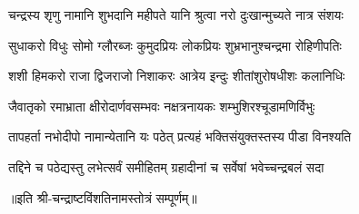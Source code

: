 

\twolineshloka
{चन्द्रस्य शृणु नामानि शुभदानि महीपते}
{यानि श्रुत्वा नरो दुःखान्मुच्यते नात्र संशयः}

\twolineshloka
{सुधाकरो विधुः सोमो ग्लौरब्जः कुमुदप्रियः}
{लोकप्रियः शुभ्रभानुश्चन्द्रमा रोहिणीपतिः}

\twolineshloka
{शशी हिमकरो राजा द्विजराजो निशाकरः}
{आत्रेय इन्दुः शीतांशुरोषधीशः कलानिधिः}

\twolineshloka
{जैवातृको रमाभ्राता क्षीरोदार्णवसम्भवः}
{नक्षत्रनायकः शम्भुशिरश्चूडामणिर्विभुः}

\twolineshloka
{तापहर्ता नभोदीपो नामान्येतानि यः पठेत्}
{प्रत्यहं भक्तिसंयुक्तस्तस्य पीडा विनश्यति}

\twolineshloka
{तद्दिने च पठेद्यस्तु लभेत्सर्वं समीहितम्}
{ग्रहादीनां च सर्वेषां भवेच्चन्द्रबलं सदा}


॥इति श्री-चन्द्राष्टविंशतिनामस्तोत्रं सम्पूर्णम्॥